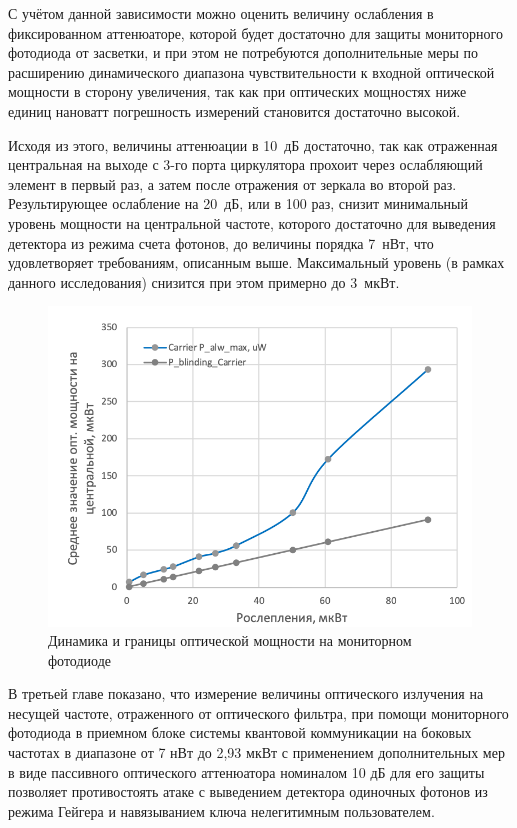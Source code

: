 С учётом данной зависимости можно оценить величину ослабления в фиксированном аттенюаторе, которой будет достаточно для защиты мониторного фотодиода от засветки, и при этом не потребуются дополнительные меры по расширению динамического диапазона чувствительности к входной оптической мощности в сторону увеличения, так как при оптических мощностях ниже единиц нановатт погрешность измерений становится достаточно высокой.   

Исходя из этого, величины аттенюации в 10~дБ достаточно, так как отраженная центральная на выходе с 3-го порта циркулятора прохоит через ослабляющий элемент в первый раз, а затем после отражения от зеркала во второй раз. Результирующее ослабление на 20~дБ, или в 100 раз, снизит минимальный уровень мощности на центральной частоте, которого достаточно для выведения детектора из режима счета фотонов, до величины порядка 7~нВт, что удовлетворяет требованиям, описанным выше. Максимальный уровень (в рамках данного исследования) снизится при этом примерно до 3~мкВт. 

 \begin{figure}[ht]
  \centering
  \includegraphics[scale=0.5]{images/Watchdog_photodiode.png}
  \caption{Динамика и границы оптической мощности на мониторном фотодиоде}
  \label{fig:Watchdog_photodiode}
\end{figure}


 В третьей главе показано, что измерение величины оптического излучения на несущей частоте, отраженного от оптического фильтра, при помощи мониторного фотодиода в приемном блоке системы квантовой коммуникации на боковых частотах в диапазоне от 7 нВт до 2,93 мкВт с применением дополнительных мер в виде пассивного оптического аттенюатора номиналом 10 дБ для его защиты позволяет противостоять атаке с выведением детектора одиночных фотонов из режима Гейгера и навязыванием ключа нелегитимным пользователем. 

